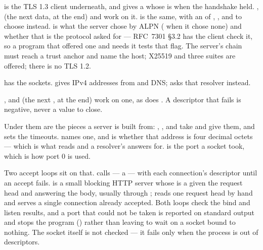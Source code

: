 is the TLS 1.3 client underneath, and
 gives a  whose
 is  when the handshake held. ,
 (the next data,  at the end) and
 work on it.  is the same, with an  of , ,  and
 to choose instead.  is what the server chose by
ALPN ( when it chose none) and  whether that is
the protocol  asked for --- RFC~7301 \S3.2 has the client check it,
so a program that offered one and needs it tests that flag. The server's chain must reach a
trust anchor and name the host; X25519 and three suites are offered;
there is no TLS 1.2.

 has the sockets.  gives IPv4
addresses from  and DNS;  asks that resolver instead.

, 
and  (the next ,  at the end)
work on one, as does . A descriptor that fails is
negative, never a value to close.

Under them are the pieces a server is built from: ,
,
 and  take and
give them, and  sets the timeouts.
 names one, and 
is whether that address is four decimal octets --- which is what 
reads  and a resolver's answers for. 
is the port a socket took, which is how port 0 is used.

Two accept loops sit on that.  calls
 --- a  --- with each connection's
descriptor until an accept fails.  is
a small blocking HTTP server whose  is a 
given the request head and answering the body, usually through
;
 reads one request head by hand and
 serves a single connection
already accepted. Both loops check the bind and listen results, and a port
that could not be taken is reported on standard output and stops the
program () rather than leaving  to wait on a socket bound to
nothing. The socket itself is not checked --- it fails only when the
process is out of descriptors.

